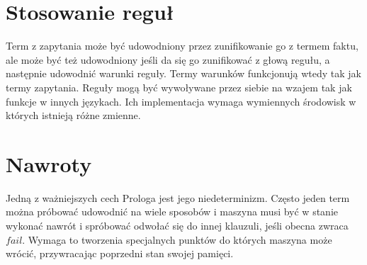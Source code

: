 \section{Stosowanie reguł}

Term z zapytania może być udowodniony przez zunifikowanie go z termem faktu, ale może być też udowodniony jeśli da się go zunifikować z głową regułu, a następnie udowodnić warunki reguły. Termy warunków funkcjonują wtedy tak jak termy zapytania. Reguły mogą być wywoływane przez siebie na wzajem tak jak funkcje w innych językach. Ich implementacja wymaga wymiennych środowisk w których istnieją różne zmienne.

\section{Nawroty}

Jedną z ważniejszych cech Prologa jest jego niedeterminizm. Często jeden term można próbować udowodnić na wiele sposobów i maszyna musi być w stanie wykonać nawrót i spróbować odwołać się do innej klauzuli, jeśli obecna zwraca $fail$. Wymaga to tworzenia specjalnych punktów do których maszyna może wrócić, przywracając poprzedni stan swojej pamięci.
